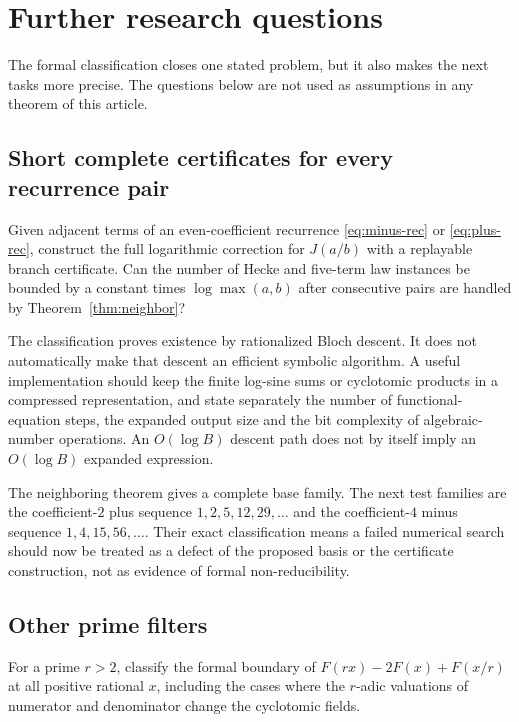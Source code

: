 \section{Further research questions}
\label{sec:future}

The formal classification closes one stated problem, but it also makes
the next tasks more precise. The questions below are not used as
assumptions in any theorem of this article.

\subsection{Short complete certificates for every recurrence pair}

\begin{question}\label{question:certificates}
Given adjacent terms of an even-coefficient recurrence
\eqref{eq:minus-rec} or \eqref{eq:plus-rec}, construct the full
logarithmic correction for $J(a/b)$ with a replayable branch certificate.
Can the number of Hecke and five-term law instances be bounded by a
constant times $\log\max(a,b)$ after consecutive pairs are handled by
Theorem~\ref{thm:neighbor}?
\end{question}

The classification proves existence by rationalized Bloch descent. It
does not automatically make that descent an efficient symbolic
algorithm. A useful implementation should keep the finite log-sine sums
or cyclotomic products in a compressed representation, and state
separately the number of functional-equation steps, the expanded output
size and the bit complexity of algebraic-number operations. An
$O(\log B)$ descent path does not by itself imply an $O(\log B)$
expanded expression.

The neighboring theorem gives a complete base family. The next test
families are the coefficient-$2$ plus sequence
$1,2,5,12,29,\ldots$ and the coefficient-$4$ minus sequence
$1,4,15,56,\ldots$. Their exact classification means a failed numerical
search should now be treated as a defect of the proposed basis or the
certificate construction, not as evidence of formal non-reducibility.

\subsection{Other prime filters}

\begin{question}\label{question:prime-filter}
For a prime $r>2$, classify the formal boundary of
$F(rx)-2F(x)+F(x/r)$ at all positive rational $x$, including the cases
where the $r$-adic valuations of numerator and denominator change the
cyclotomic fields.
\end{question}

